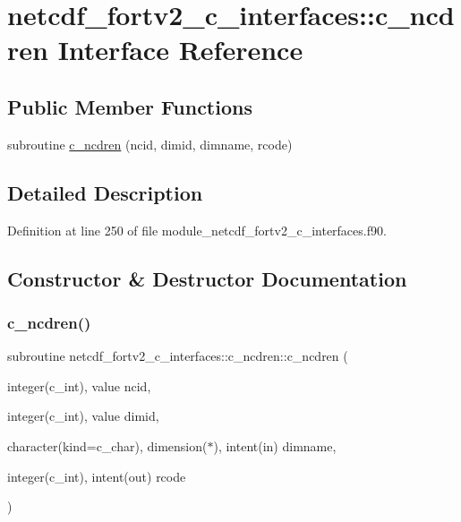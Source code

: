 \hypertarget{interfacenetcdf__fortv2__c__interfaces_1_1c__ncdren}{}\section{netcdf\+\_\+fortv2\+\_\+c\+\_\+interfaces\+:\+:c\+\_\+ncdren Interface Reference}
\label{interfacenetcdf__fortv2__c__interfaces_1_1c__ncdren}
\subsection*{Public Member Functions}
\begin{DoxyCompactItemize}
\item 
subroutine \hyperlink{interfacenetcdf__fortv2__c__interfaces_1_1c__ncdren_a4b6049012b952746338b2fbec8a3be8e}{c\+\_\+ncdren} (ncid, dimid, dimname, rcode)
\end{DoxyCompactItemize}


\subsection{Detailed Description}


Definition at line 250 of file module\+\_\+netcdf\+\_\+fortv2\+\_\+c\+\_\+interfaces.\+f90.



\subsection{Constructor \& Destructor Documentation}
\mbox{\label{interfacenetcdf__fortv2__c__interfaces_1_1c__ncdren_a4b6049012b952746338b2fbec8a3be8e}} 
\subsubsection{\texorpdfstring{c\+\_\+ncdren()}{c\_ncdren()}}
{\footnotesize\ttfamily subroutine netcdf\+\_\+fortv2\+\_\+c\+\_\+interfaces\+::c\+\_\+ncdren\+::c\+\_\+ncdren (\begin{DoxyParamCaption}\item[{integer(c\+\_\+int), value}]{ncid,  }\item[{integer(c\+\_\+int), value}]{dimid,  }\item[{character(kind=c\+\_\+char), dimension($\ast$), intent(in)}]{dimname,  }\item[{integer(c\+\_\+int), intent(out)}]{rcode }\end{DoxyParamCaption})}



